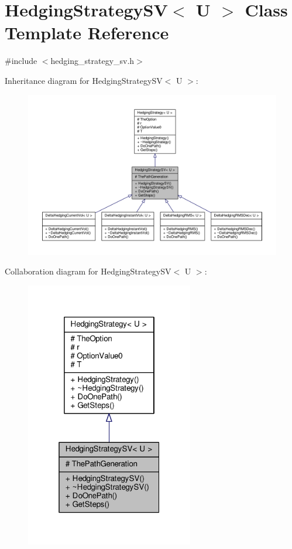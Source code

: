 \hypertarget{classHedgingStrategySV}{}\section{Hedging\+Strategy\+SV$<$ U $>$ Class Template Reference}
\label{classHedgingStrategySV}


{\ttfamily \#include $<$hedging\+\_\+strategy\+\_\+sv.\+h$>$}



Inheritance diagram for Hedging\+Strategy\+SV$<$ U $>$\+:
\nopagebreak
\begin{figure}[H]
\begin{center}
\leavevmode
\includegraphics[width=350pt]{classHedgingStrategySV__inherit__graph}
\end{center}
\end{figure}


Collaboration diagram for Hedging\+Strategy\+SV$<$ U $>$\+:
\nopagebreak
\begin{figure}[H]
\begin{center}
\leavevmode
\includegraphics[width=208pt]{classHedgingStrategySV__coll__graph}
\end{center}
\end{figure}
